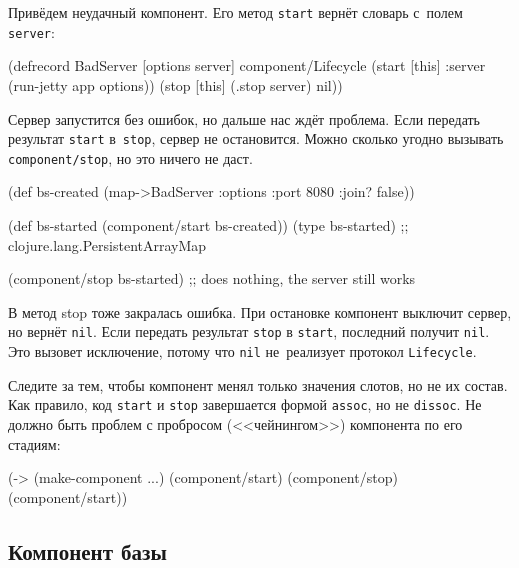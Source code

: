 Привёдем неудачный компонент. Его метод \verb|start| вернёт словарь с~полем
\verb|server|:

\begin{english}
  \begin{clojure}
(defrecord BadServer [options server]
  component/Lifecycle
  (start [this]
    {:server (run-jetty app options)})
  (stop [this]
    (.stop server)
    nil))
  \end{clojure}
\end{english}

Сервер запустится без ошибок, но дальше нас ждёт проблема. Если передать
результат \verb|start| в~\verb|stop|, сервер не остановится. Можно сколько
угодно вызывать \verb|component/stop|, но это ничего не даст.

\begin{english}
  \begin{clojure}
(def bs-created (map->BadServer
                  {:options {:port 8080 :join? false}}))

(def bs-started (component/start bs-created))
(type bs-started)
;; clojure.lang.PersistentArrayMap

(component/stop bs-started)
;; does nothing, the server still works
  \end{clojure}
\end{english}

В метод stop тоже закралась ошибка. При остановке компонент выключит сервер, но
вернёт \verb|nil|. Если передать результат \verb|stop| в \verb|start|,
последний получит \verb|nil|. Это вызовет исключение, потому что \verb|nil|
не~реализует протокол \verb|Lifecycle|.


Следите за тем, чтобы компонент менял только значения слотов, но не их
состав. Как правило, код \verb|start| и \verb|stop| завершается формой
\verb|assoc|, но не \verb|dissoc|. Не должно быть проблем с пробросом
(<<чейнингом>>) компонента по его стадиям:

\begin{english}
  \begin{clojure}
(-> (make-component {...})
    (component/start)
    (component/stop)
    (component/start))
  \end{clojure}
\end{english}


\subsection{Компонент базы}

